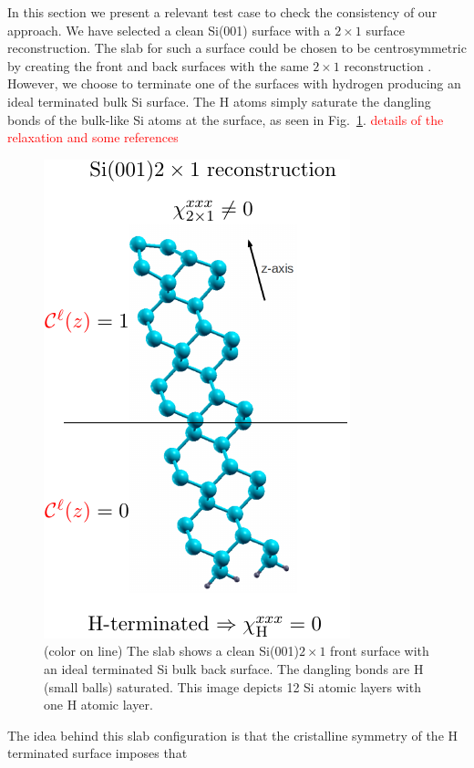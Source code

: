 \documentclass[floatfix,prb,aps,superscriptaddress,11pt,preprint,letterpaper]{revtex4}
\def\chon{red}
\begin{document}
In this section we present a 
{\color{\chon} relevant test case} to check the
consistency of {\color{\chon} our approach. We have selected}
a clean Si(001) surface with a $2\times 1$ surface reconstruction.
The slab for such a surface could be chosen to be centrosymmetric 
by {\color{\chon} creating} the front {\color{\chon} and back} 
surfaces with the same $2\times 1$
reconstruction{\color{\chon} . However, we choose to} terminate one 
of the surfaces with hydrogen {\color{\chon} producing an ideal  
terminated} bulk Si surface. {\color{\chon} The} H atoms simply saturate the 
dangling bonds of the bulk-like Si atoms at the surface, as seen in 
Fig.~\ref{si2x1}.
\textcolor{red}{details of the relaxation and some references}
\begin{figure}
\centering 
\includegraphics[scale=.8]{images/si2x1-crop}
\caption{(color on line) The slab shows a 
    {\color{\chon} clean Si(001)$2\times 1$ front surface 
    with an ideal terminated Si bulk back surface. The}
    dangling bonds are H (small balls) saturated. 
    This {\color{\chon} image depicts} 12 Si atomic layers
    {\color{\chon} with one} H atomic layer. 
\label{si2x1}} 
\end{figure} 
The idea {\color{\chon} behind this slab configuration} is that the 
cristalline symmetry of the H terminated surface imposes that 
\end{document}
